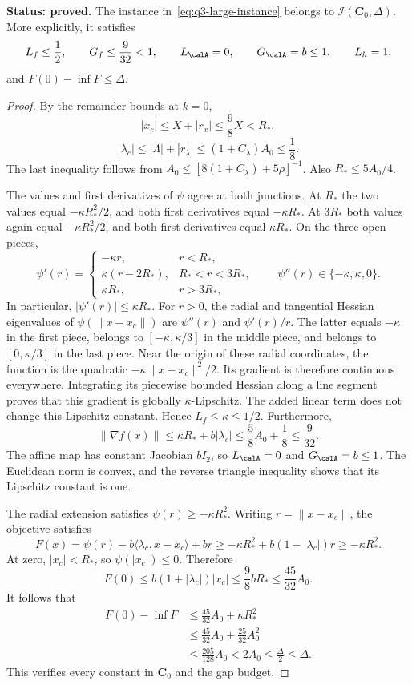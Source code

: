 \begin{lemma}
\label{lem:q3-large-instance}
\textbf{Status: proved.}
The instance in~\eqref{eq:q3-large-instance} belongs to
\(\mathcal I(\mathbf C_0,\Delta)\). More explicitly, it satisfies
\[
L_f\le\frac12,\qquad G_f\le\frac9{32}<1,
\qquad L_{\calA}=0,\qquad G_{\calA}=b\le1,
\qquad L_h=1,
\]
and \(F(0)-\inf F\le\Delta\).
\end{lemma}

\begin{proof}
By the remainder bounds at \(k=0\),
\[
|x_c|\le X+|r_x|\le\frac98X<R_*,
\]
\[
|\lambda_c|\le|\Lambda|+|r_\lambda|
\le(1+C_\lambda)A_0\le\frac18.
\]
The last inequality follows from
\(A_0\le[8(1+C_\lambda)+5\rho]^{-1}\).
Also \(R_*\le5A_0/4\).

The values and first derivatives of \(\psi\) agree at both junctions.
At \(R_*\) the two values equal \(-\kappa R_*^2/2\), and both
first derivatives equal \(-\kappa R_*\). At \(3R_*\) both values
again equal \(-\kappa R_*^2/2\), and both first derivatives equal
\(\kappa R_*\). On the three open pieces,
\[
\psi'(r)=
\begin{cases}
-\kappa r,&r<R_*,\\
\kappa(r-2R_*),&R_*<r<3R_*,\\
\kappa R_*,&r>3R_*,
\end{cases}
\qquad
\psi''(r)\in\{-\kappa,\kappa,0\}.
\]
In particular, \(|\psi'(r)|\le\kappa R_*\).
For \(r>0\), the radial and tangential Hessian eigenvalues of
\(\psi(\|x-x_c\|)\) are \(\psi''(r)\) and \(\psi'(r)/r\).
The latter equals \(-\kappa\) in the first piece, belongs to
\([-\kappa,\kappa/3]\) in the middle piece, and belongs to
\([0,\kappa/3]\) in the last piece. Near the origin of these radial
coordinates, the function is the quadratic
\(-\kappa\|x-x_c\|^2/2\).
Its gradient is therefore continuous everywhere. Integrating its
piecewise bounded Hessian along a line segment proves that this gradient
is globally \(\kappa\)-Lipschitz. The added linear term does not change
this Lipschitz constant. Hence \(L_f\le\kappa\le1/2\).
Furthermore,
\[
\|\nabla f(x)\|
\le\kappa R_*+b|\lambda_c|
\le\frac58A_0+\frac18
\le\frac9{32}.
\]
The affine map has constant Jacobian \(bI_2\), so
\(L_{\calA}=0\) and \(G_{\calA}=b\le1\).
The Euclidean norm is convex, and the reverse triangle inequality
shows that its Lipschitz constant is one.

The radial extension satisfies \(\psi(r)\ge-\kappa R_*^2\).
Writing \(r=\|x-x_c\|\), the objective satisfies
\[
F(x)=\psi(r)-b\langle\lambda_c,x-x_c\rangle+br
\ge-\kappa R_*^2+b(1-|\lambda_c|)r
\ge-\kappa R_*^2.
\]
At zero, \(|x_c|<R_*\), so \(\psi(|x_c|)\le0\). Therefore
\[
F(0)\le b(1+|\lambda_c|)|x_c|
\le\frac98 bR_*\le\frac{45}{32}A_0.
\]
It follows that
\[
\begin{aligned}
F(0)-\inf F
&\le\frac{45}{32}A_0+\kappa R_*^2\\
&\le\frac{45}{32}A_0+\frac{25}{32}A_0^2\\
&\le\frac{205}{128}A_0
<2A_0\le\frac{\Delta}{2}\le\Delta.
\end{aligned}
\]
This verifies every constant in \(\mathbf C_0\) and the gap budget.
\end{proof}

